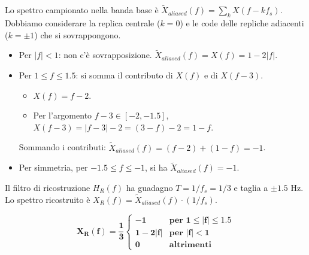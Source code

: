 \begin{soluzione}{24}
\begin{enumerate}
        Lo spettro campionato nella banda base è $\tilde{X}_{aliased}(f) = \sum_k X(f-k f_s)$. Dobbiamo considerare la replica centrale ($k=0$) e le code delle repliche adiacenti ($k=\pm 1$) che si sovrappongono.
        \begin{itemize}
            \item Per $|f|<1$: non c'è sovrapposizione. $\tilde{X}_{aliased}(f) = X(f) = 1-2|f|$.
            \item Per $1 \le f \le 1.5$: si somma il contributo di $X(f)$ e di $X(f-3)$.
            \begin{itemize}
                \item $X(f) = f-2$.
                \item Per l'argomento $f-3 \in [-2, -1.5]$, $X(f-3) = |f-3|-2 = (3-f)-2 = 1-f$.
            \end{itemize}
            Sommando i contributi: $\tilde{X}_{aliased}(f) = (f-2) + (1-f) = -1$.
            \item Per simmetria, per $-1.5 \le f \le -1$, si ha $\tilde{X}_{aliased}(f) = -1$.
        \end{itemize}
        Il filtro di ricostruzione $H_R(f)$ ha guadagno $T=1/f_s=1/3$ e taglia a $\pm 1.5$ Hz. Lo spettro ricostruito è $X_R(f) = \tilde{X}_{aliased}(f) \cdot (1/f_s)$.
        
        \[
            \mathbf{X_R(f) = \frac{1}{3} \begin{cases} -1 & \text{per } 1 \le |f| \le 1.5 \\ 1-2|f| & \text{per } |f|<1 \\ 0 & \text{altrimenti} \end{cases}}
        \]
    \end{enumerate}
\end{soluzione}